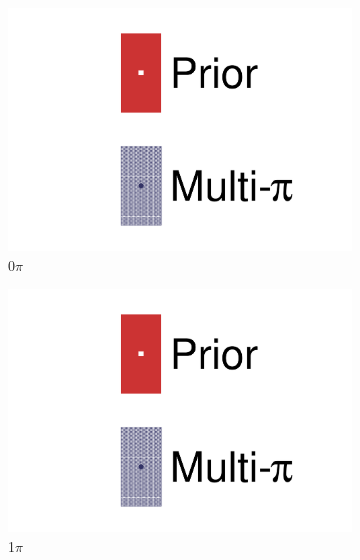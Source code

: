 \begin{figure}[h]
	\begin{subfigure}[t]{0.32\textwidth}
		\includegraphics[width=\textwidth,page=55, trim={0mm 0mm 0mm 0mm}, clip]{figures/mach3/2018/data/2018a_FixedCov_RedCov_Mpi_Data_merge_drawPar_withDet}
		\caption{0$\pi$}
	\end{subfigure}
	\begin{subfigure}[t]{0.32\textwidth}
		\includegraphics[width=\textwidth,page=56, trim={0mm 0mm 0mm 0mm}, clip]{figures/mach3/2018/data/2018a_FixedCov_RedCov_Mpi_Data_merge_drawPar_withDet}
		\caption{1$\pi$}
	\end{subfigure}
	\begin{subfigure}[t]{0.32\textwidth}

\end{subfigure}
\end{figure}
